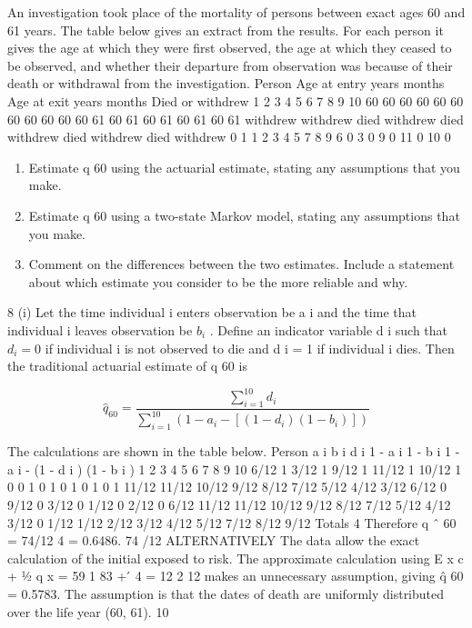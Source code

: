 \documentclass[a4paper,12pt]{article}
\begin{document}


An investigation took place of the mortality of persons between exact ages 60 and 61
years. The table below gives an extract from the results. For each person it gives the
age at which they were first observed, the age at which they ceased to be observed,
and whether their departure from observation was because of their death or
withdrawal from the investigation.
Person Age at entry
years months Age at exit
years months Died or withdrew
1
2
3
4
5
6
7
8
9
10 60
60
60
60
60
60
60
60
60
60 60
61
60
61
60
61
60
61
60
61 withdrew
withdrew
died
withdrew
died
withdrew
died
withdrew
died
withdrew
0
1
1
2
3
4
5
7
8
9
6
0
3
0
9
0
11
0
10
0

\begin{enumerate}
\item Estimate q 60 using the actuarial estimate, stating any assumptions that you
make.
\item Estimate q 60 using a two-state Markov model, stating any assumptions that
you make.
\item Comment on the differences between the two estimates. Include a statement
about which estimate you consider to be the more reliable and why.
\end{enumerate}


8
(i)
Let the time individual i enters observation be a i and the time that individual i
leaves observation be $b_i$ . Define an indicator variable d i such that $d_i = 0$ if individual i is not observed to die and d i = 1 if individual i dies. Then the
traditional actuarial estimate of q 60 is

\[ \hat{q}_{60} =   \frac{\sum^{10}_{i=1} d_{i}}{\sum^{10}_{i=1} \left(  1-a_i - [(1-d_{i})(1-b_{i}) ] \right)} \]



The calculations are shown in the table below.
Person a i b i d i 1 - a i 1 - b i 1 - a i - (1 - d i ) (1 - b i )
1
2
3
4
5
6
7
8
9
10 6/12
1
3/12
1
9/12
1
11/12
1
10/12
1 0
0
1
0
1
0
1
0
1
0 1
11/12
11/12
10/12
9/12
8/12
7/12
5/12
4/12
3/12 6/12
0
9/12
0
3/12
0
1/12
0
2/12
0 6/12
11/12
11/12
10/12
9/12
8/12
7/12
5/12
4/12
3/12
0
1/12
1/12
2/12
3/12
4/12
5/12
7/12
8/12
9/12
Totals
4
Therefore q ˆ 60 =
74/12
4
= 0.6486.
74 /12
ALTERNATIVELY
The data allow the exact calculation of the initial exposed to risk. The
approximate calculation using
E x c + 1⁄2 q x =
59 1
83
+  ́ 4 =
12 2
12
makes an unnecessary assumption, giving q̂ 60 = 0.5783.
The assumption is that the dates of death are uniformly distributed over the
life year (60, 61).%
10
\end{document}
